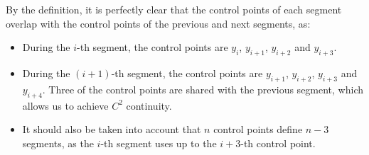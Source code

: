 By the definition, it is perfectly clear that the control points of each segment overlap with the control points of the previous and next segments, as:
\begin{itemize}
    \item During the $i$-th segment, the control points are $y_i$, $y_{i+1}$, $y_{i+2}$ and $y_{i+3}$.
    \item During the $(i+1)$-th segment, the control points are $y_{i+1}$, $y_{i+2}$, $y_{i+3}$ and $y_{i+4}$. Three of the control points are shared with the previous segment, which allows us to achieve $C^2$ continuity.
    \item It should also be taken into account that $n$ control points define $n-3$ segments, as the $i$-th segment uses up to the $i+3$-th control point.
\end{itemize}

